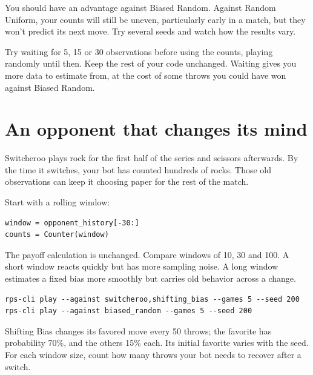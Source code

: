 \documentclass[11pt]{article}
\begin{document}
You should have an advantage against Biased Random. Against Random Uniform, your counts will still be uneven, particularly early in a match, but they won't predict its next move. Try several seeds and watch how the results vary.


Try waiting for 5, 15 or 30 observations before using the counts, playing randomly until then. Keep the rest of your code unchanged. Waiting gives you more data to estimate from, at the cost of some throws you could have won against Biased Random.
\par
\clearpage
\section*{An opponent that changes its mind}

\begin{context}
Switcheroo plays rock for the first half of the series and scissors afterwards. By the time it switches, your bot has counted hundreds of rocks. Those old observations can keep it choosing paper for the rest of the match.

\end{context}


Start with a rolling window:


\begin{lstlisting}[style=python,numbers=none,xleftmargin=4pt,framexleftmargin=0pt]
window = opponent_history[-30:]
counts = Counter(window)
\end{lstlisting}

The payoff calculation is unchanged. Compare windows of 10, 30 and 100. A short window reacts quickly but has more sampling noise. A long window estimates a fixed bias more smoothly but carries old behavior across a change.


\begin{lstlisting}[style=shell,numbers=none,xleftmargin=4pt,framexleftmargin=0pt]
rps-cli play --against switcheroo,shifting_bias --games 5 --seed 200
rps-cli play --against biased_random --games 5 --seed 200
\end{lstlisting}

Shifting Bias changes its favored move every 50 throws; the favorite has probability 70\%, and the others 15\% each. Its initial favorite varies with the seed. For each window size, count how many throws your bot needs to recover after a switch.


\end{document}
